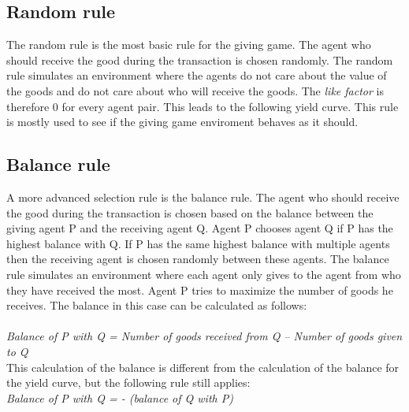 \documentclass[twoside,openright]{uva-bachelor-thesis}
\begin{document}
\subsection{Random rule}
The random rule is the most basic rule for the giving game. The agent who should receive the good during the transaction is chosen randomly. The random rule simulates an environment where the agents do not care about the value of the goods and do not care about who will receive the goods. The \textit{like factor} is therefore 0 for every agent pair. This leads to the following yield curve. This rule is mostly used to see if the giving game enviroment behaves as it should.

\subsection{Balance rule}
A more advanced selection rule is the balance rule. The agent who should receive the good during the transaction is chosen based on the balance between the giving agent P and the receiving agent Q. Agent P chooses agent Q if P has the highest balance with Q. If P has the same highest balance with multiple agents then the receiving agent is chosen randomly between these agents. The balance rule simulates an environment where each agent only gives to the agent from who they have received the most. Agent P tries to maximize the number of goods he receives. The balance in this case can be calculated as follows: 
\\
\\
\textit{Balance of P with Q = Number of goods received from Q – Number of goods given to Q} \\
This calculation of the balance is different from the calculation of the balance for the yield curve, but the following rule still applies:\\
\textit{Balance of P with Q = - (balance of Q with P)}
\end{document}
